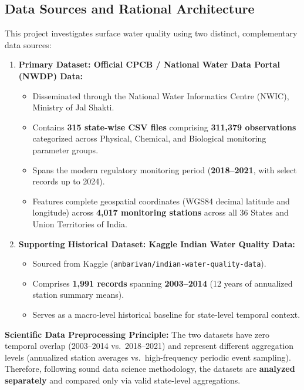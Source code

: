 \documentclass[
]{article}
\providecommand{\tightlist}{%
  \setlength{\itemsep}{0pt}\setlength{\parskip}{0pt}}
\begin{document}
\subsection{Data Sources and Rational
Architecture}\label{data-sources-and-rational-architecture}

This project investigates surface water quality using two distinct,
complementary data sources:

\begin{enumerate}
\def\labelenumi{\arabic{enumi}.}
\tightlist
\item
  \textbf{Primary Dataset: Official CPCB / National Water Data Portal
  (NWDP) Data:}

  \begin{itemize}
  \tightlist
  \item
    Disseminated through the National Water Informatics Centre (NWIC),
    Ministry of Jal Shakti.
  \item
    Contains \textbf{315 state-wise CSV files} comprising
    \textbf{311,379 observations} categorized across Physical, Chemical,
    and Biological monitoring parameter groups.
  \item
    Spans the modern regulatory monitoring period (\textbf{2018--2021},
    with select records up to 2024).
  \item
    Features complete geospatial coordinates (WGS84 decimal latitude and
    longitude) across \textbf{4,017 monitoring stations} across all 36
    States and Union Territories of India.
  \end{itemize}
\item
  \textbf{Supporting Historical Dataset: Kaggle Indian Water Quality
  Data:}

  \begin{itemize}
  \tightlist
  \item
    Sourced from Kaggle (\texttt{anbarivan/indian-water-quality-data}).
  \item
    Comprises \textbf{1,991 records} spanning \textbf{2003--2014} (12
    years of annualized station summary means).
  \item
    Serves as a macro-level historical baseline for state-level temporal
    context.
  \end{itemize}
\end{enumerate}

\textbf{Scientific Data Preprocessing Principle:} The two datasets have
zero temporal overlap (2003--2014 vs.~2018--2021) and represent
different aggregation levels (annualized station averages
vs.~high-frequency periodic event sampling). Therefore, following sound
data science methodology, the datasets are \textbf{analyzed separately}
and compared only via valid state-level aggregations.
\end{document}
